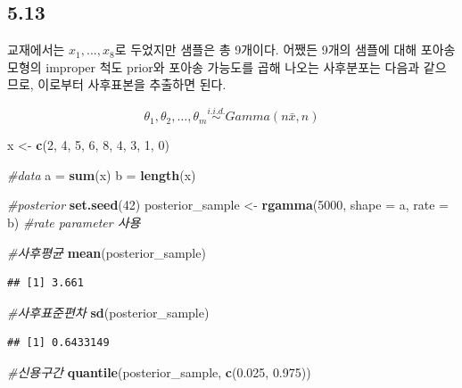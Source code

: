 \documentclass[
]{article}
\newenvironment{Shaded}{\begin{snugshade}}{\end{snugshade}}
\newcommand{\AttributeTok}[1]{\textcolor[rgb]{0.13,0.29,0.53}{#1}}
\newcommand{\CommentTok}[1]{\textcolor[rgb]{0.56,0.35,0.01}{\textit{#1}}}
\newcommand{\DecValTok}[1]{\textcolor[rgb]{0.00,0.00,0.81}{#1}}
\newcommand{\FloatTok}[1]{\textcolor[rgb]{0.00,0.00,0.81}{#1}}
\newcommand{\FunctionTok}[1]{\textcolor[rgb]{0.13,0.29,0.53}{\textbf{#1}}}
\newcommand{\NormalTok}[1]{#1}
\newcommand{\OtherTok}[1]{\textcolor[rgb]{0.56,0.35,0.01}{#1}}
\begin{document}
\subsection{5.13}\label{section-2}

교재에서는 \(x_1, ..., x_8\)로 두었지만 샘플은 총 9개이다. 어쨌든 9개의
샘플에 대해 포아송 모형의 improper 척도 prior와 포아송 가능도를 곱해
나오는 사후분포는 다음과 같으므로, 이로부터 사후표본을 추출하면 된다.

\[{\theta}_1, {\theta}_2, \ldots, {\theta}_m \stackrel{i.i.d.}{\sim} 
Gamma(n\bar{x}, n)\]

\begin{Shaded}
\begin{Highlighting}[]
\NormalTok{x }\OtherTok{\textless{}{-}} \FunctionTok{c}\NormalTok{(}\DecValTok{2}\NormalTok{, }\DecValTok{4}\NormalTok{, }\DecValTok{5}\NormalTok{, }\DecValTok{6}\NormalTok{, }\DecValTok{8}\NormalTok{, }\DecValTok{4}\NormalTok{, }\DecValTok{3}\NormalTok{, }\DecValTok{1}\NormalTok{, }\DecValTok{0}\NormalTok{)}

\CommentTok{\#data}
\NormalTok{a }\OtherTok{=} \FunctionTok{sum}\NormalTok{(x)}
\NormalTok{b }\OtherTok{=} \FunctionTok{length}\NormalTok{(x)}

\CommentTok{\#posterior}
\FunctionTok{set.seed}\NormalTok{(}\DecValTok{42}\NormalTok{)}
\NormalTok{posterior\_sample }\OtherTok{\textless{}{-}} \FunctionTok{rgamma}\NormalTok{(}\DecValTok{5000}\NormalTok{, }\AttributeTok{shape =}\NormalTok{ a, }\AttributeTok{rate =}\NormalTok{ b) }\CommentTok{\#rate parameter 사용 }

\CommentTok{\#사후평균}
\FunctionTok{mean}\NormalTok{(posterior\_sample)}
\end{Highlighting}
\end{Shaded}

\begin{verbatim}
## [1] 3.661
\end{verbatim}

\begin{Shaded}
\begin{Highlighting}[]
\CommentTok{\#사후표준편차}
\FunctionTok{sd}\NormalTok{(posterior\_sample)}
\end{Highlighting}
\end{Shaded}

\begin{verbatim}
## [1] 0.6433149
\end{verbatim}

\begin{Shaded}
\begin{Highlighting}[]
\CommentTok{\#신용구간}
\FunctionTok{quantile}\NormalTok{(posterior\_sample, }\FunctionTok{c}\NormalTok{(}\FloatTok{0.025}\NormalTok{, }\FloatTok{0.975}\NormalTok{))}
\end{Highlighting}
\end{Shaded}
\end{document}
